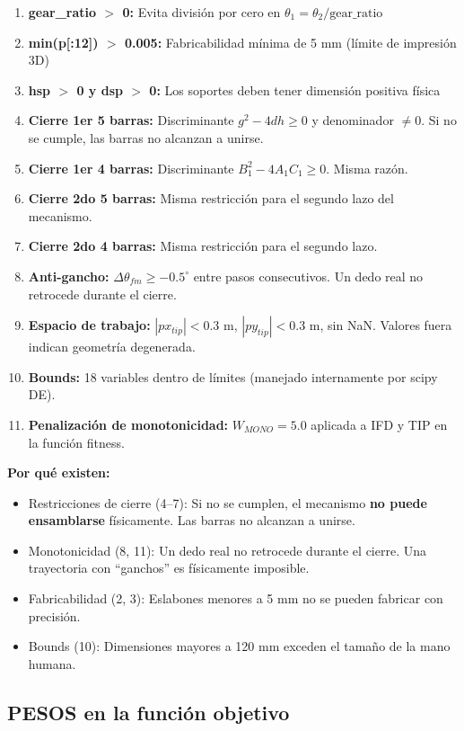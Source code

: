 \documentclass[11pt,letterpaper]{article}
\begin{document}
\begin{enumerate}
\item \textbf{gear\_ratio $>$ 0:} Evita divisi\'on por cero en $\theta_1 = \theta_2/\text{gear\_ratio}$
\item \textbf{min(p[:12]) $>$ 0.005:} Fabricabilidad m\'inima de 5 mm (l\'imite de impresi\'on 3D)
\item \textbf{hsp $>$ 0 y dsp $>$ 0:} Los soportes deben tener dimensi\'on positiva f\'isica
\item \textbf{Cierre 1er 5 barras:} Discriminante $g^2 - 4dh \geq 0$ y denominador $\neq 0$. Si no se cumple, las barras no alcanzan a unirse.
\item \textbf{Cierre 1er 4 barras:} Discriminante $B_1^2 - 4A_1C_1 \geq 0$. Misma raz\'on.
\item \textbf{Cierre 2do 5 barras:} Misma restricci\'on para el segundo lazo del mecanismo.
\item \textbf{Cierre 2do 4 barras:} Misma restricci\'on para el segundo lazo.
\item \textbf{Anti-gancho:} $\Delta\theta_{fm} \geq -0.5^\circ$ entre pasos consecutivos. Un dedo real no retrocede durante el cierre.
\item \textbf{Espacio de trabajo:} $|px_{tip}| < 0.3$ m, $|py_{tip}| < 0.3$ m, sin NaN. Valores fuera indican geometr\'ia degenerada.
\item \textbf{Bounds:} 18 variables dentro de l\'imites (manejado internamente por scipy DE).
\item \textbf{Penalizaci\'on de monotonicidad:} $W_{MONO} = 5.0$ aplicada a IFD y TIP en la funci\'on fitness.
\end{enumerate}

\textbf{Por qu\'e existen:}
\begin{itemize}
\item Restricciones de cierre (4--7): Si no se cumplen, el mecanismo \textbf{no puede ensamblarse} f\'isicamente. Las barras no alcanzan a unirse.
\item Monotonicidad (8, 11): Un dedo real no retrocede durante el cierre. Una trayectoria con ``ganchos'' es f\'isicamente imposible.
\item Fabricabilidad (2, 3): Eslabones menores a 5 mm no se pueden fabricar con precisi\'on.
\item Bounds (10): Dimensiones mayores a 120 mm exceden el tama\~no de la mano humana.
\end{itemize}

\subsection{PESOS en la funci\'on objetivo}
\end{document}
